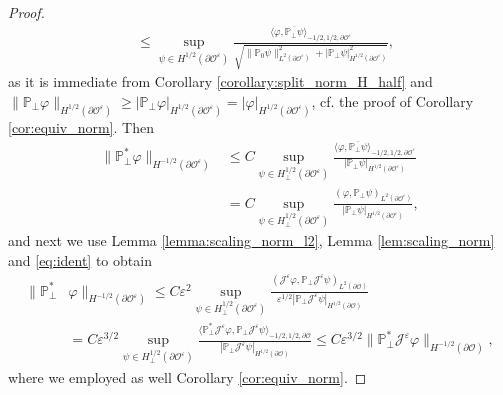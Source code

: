 \documentclass[]{article}
\numberwithin{equation}{section}
\numberwithin{theorem}{section}
\numberwithin{lemma}{section}
\numberwithin{corollary}{section}
\numberwithin{proposition}{section}
\numberwithin{definition}{section}
\newcommand{\re}{\varepsilon}
\renewcommand{\O}{\mathcal{O}}
\renewcommand{\vec}{\boldsymbol}
\begin{document}
\begin{appendices}
\begin{proof}
\begin{align*}
				&\leq \sup\limits_{{\psi}\in H^{1/2}(\partial\mathcal{O}^{\re})}\frac{\langle{\varphi}, \overline{\mathbb{P}_{\perp}{\psi}}\rangle_{-1/2,1/2,\partial\mathcal{O}^{\re}}}{\sqrt{\|\mathbb{P}_0\psi\|^2_{L^2(\partial\mathcal{O}^{\re})}+|\mathbb{P}_{\perp}\psi|^2_{H^{1/2}(\partial\mathcal{O}^{\re})}}}, 
			\end{align*}
			as it is immediate from Corollary \ref{corollary:split_norm_H_half} and $\|\mathbb{P}_{\perp}\varphi\|_{H^{1/2}(\partial\mathcal{O}^{\re})}\geq |\mathbb{P}_{\perp}\varphi|_{H^{1/2}(\partial\mathcal{O}^{\re})}=|\varphi|_{H^{1/2}(\partial\mathcal{O}^{\re})}$, cf. the proof of Corollary \ref{cor:equiv_norm}. Then 
			\begin{align*}
				\|\mathbb{P}_{\perp}^*{\varphi}\|_{H^{-1/2}(\partial\mathcal{O}^{\re})}&\leq C\sup\limits_{{\psi}\in H^{1/2}_{\perp}(\partial\mathcal{O}^{\re})}\frac{\langle{\varphi}, \overline{\mathbb{P}_{\perp}{\psi}}\rangle_{-1/2,1/2,\partial\mathcal{O}^{\re}}}{|\mathbb{P}_{\perp}\psi|_{H^{1/2}(\partial\mathcal{O}^{\re})}}\\
				&=C\sup\limits_{{\psi}\in H^{1/2}_{\perp}(\partial\mathcal{O}^{\re})}\frac{({\varphi}, {\mathbb{P}_{\perp}{\psi}})_{L^2(\partial\mathcal{O}^{\re})}}{|\mathbb{P}_{\perp}\psi|_{H^{1/2}(\partial\mathcal{O}^{\re})}}, 
			\end{align*} 
			and next we use  Lemma \ref{lemma:scaling_norm_l2}, Lemma \ref{lem:scaling_norm} and \eqref{eq:ident} to obtain 
			\begin{align*}
				\|\mathbb{P}_{\perp}^*&\varphi\|_{H^{-1/2}(\partial\mathcal{O}^{\re})}\leq C\re^2 \sup\limits_{{\psi}\in H^{1/2}_{\perp}(\partial\mathcal{O}^{\re})}\frac{(\mathcal{J}^{\re}{\varphi}, {\mathbb{P}_{\perp}\mathcal{J}^{\re}{\psi}})_{L^2(\partial\mathcal{O})}}{\re^{1/2}|\mathbb{P}_{\perp}\mathcal{J}^{\re}\psi|_{H^{1/2}(\partial\mathcal{O})}}\\
				&=C\re^{3/2} \sup\limits_{{\psi}\in H^{1/2}_{\perp}(\partial\mathcal{O}^{\re})}\frac{\langle\mathbb{P}_{\perp}^*\mathcal{J}^{\re}{\varphi}, {\mathbb{P}_{\perp}\mathcal{J}^{\re}{\psi}}\rangle_{-1/2,1/2,\partial\mathcal{O}}}{|\mathbb{P}_{\perp}\mathcal{J}^{\re}\psi|_{H^{1/2}(\partial\mathcal{O})}}\leq C\re^{3/2}\|\mathbb{P}_{\perp}^*\mathcal{J}^{\re}{\varphi}\|_{H^{-1/2}(\partial\O)},
			\end{align*}
			where we employed as well Corollary \ref{cor:equiv_norm}.
			

\end{proof}
\end{appendices}
\end{document}
